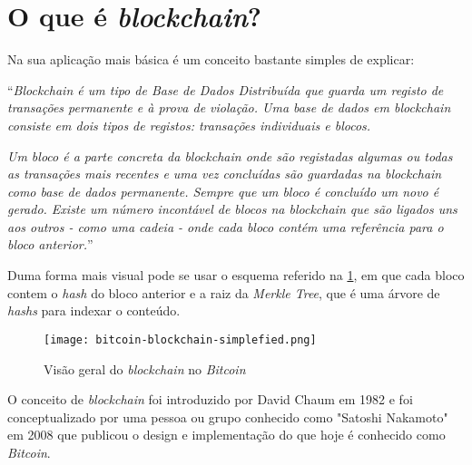 \newpage
\section{O que é \textit{blockchain}?}
\label{sec:blockchain_what}

Na sua aplicação mais básica é um conceito bastante simples de explicar:

``\textit{Blockchain é um tipo de Base de Dados Distribuída que guarda um registo de transações permanente e à prova de violação. Uma base de dados em blockchain consiste em dois tipos de registos: transações individuais e blocos.}

\textit{Um bloco é a parte concreta da blockchain onde são registadas algumas ou todas as transações mais recentes e uma vez concluídas são guardadas na blockchain como base de dados permanente. Sempre que um bloco é concluído um novo é gerado. Existe um número incontável de blocos na blockchain que são ligados uns aos outros - como uma cadeia - onde cada bloco contém uma referência para o bloco anterior.}'' \cite{blockchain_wiki}

Duma forma mais visual pode se usar o esquema referido na \cref{fig:blockchain-bitcoin-overview}, em que cada bloco contem o \textit{hash} do bloco anterior e a raiz da \textit{Merkle Tree}, que é uma árvore de \textit{hashs} para indexar o conteúdo.

\begin{figure}[!h]
  \centering
    \texttt{[image: bitcoin-blockchain-simplefied.png]}
  \caption{Visão geral do \textit{blockchain} no \textit{Bitcoin} \cite{bitcoin_devguide_blockchain}}
 \label{fig:blockchain-bitcoin-overview}
\end{figure}

O conceito de \textit{blockchain} foi introduzido por David Chaum em 1982 \cite{blockchain_origem} e foi conceptualizado por uma pessoa ou grupo conhecido como "Satoshi Nakamoto" em 2008 que publicou o design e implementação do que hoje é conhecido como \textit{Bitcoin}. \cite{blockchain_nakamoto}